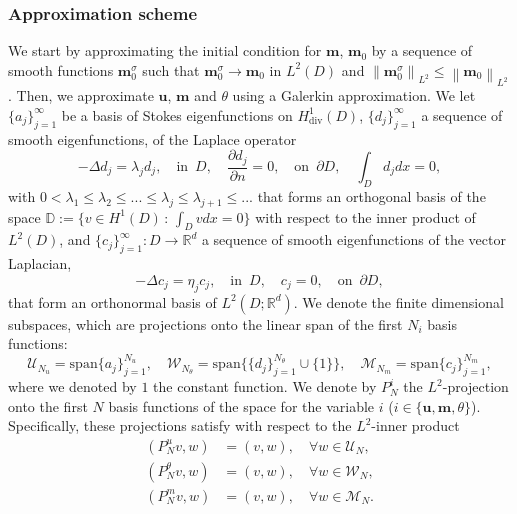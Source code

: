 \documentclass[10pt,letterpaper,twoside]{amsart}
\theoremstyle{definition}{\newtheorem{definition}[lemma]{Definition}}
\theoremstyle{note}{\newtheorem{claim}{Claim}[section]
\newtheorem*{claim*}{Claim}}
\numberwithin{equation}{section}
\newcommand{\dom}{D}
\newcommand{\norm}[1]{\left\| #1 \right\|}
\newcommand{\R}{\mathbb{R}}
\newcommand{\Div}{\operatorname{div}}
\newcommand{\V}{H^1_{\Div}(\dom)}
\newcommand{\ths}{\mathbb{D}} %
\newcommand{\bu}{\mathbf{u}}
\newcommand{\bm}{\mathbf{m}}
\begin{document}
\subsubsection{Approximation scheme}
\label{sec:scheme}
We start by approximating the initial condition for $\bm$, $\bm_0$ by a sequence of smooth functions $\bm_0^\sigma$ such that $\bm_0^\sigma\to \bm_0$ in $L^2(\dom)$ and $\norm{\bm_0^\sigma}_{L^2}\leq \norm{\bm_0}_{L^2}$.
Then, we approximate $\bu$, $\bm$ and $\theta$ using a Galerkin approximation. We let $\{a_j\}_{j=1}^\infty$ be a basis of Stokes eigenfunctions on $\V$, $\{d_j\}_{j=1}^\infty$ a sequence of smooth eigenfunctions, of the Laplace operator
\begin{equation*}
	-\Delta d_j = \lambda_j d_j,\quad \text{in }\,\dom,\quad \frac{\partial d_j}{\partial n}=0,\quad \text{on }\, \partial \dom,\quad \int_{\dom} d_j dx =0,
\end{equation*}
with $0<\lambda_1\leq \lambda_2\leq ...\leq \lambda_j\leq \lambda_{j+1}\leq ...$
that forms an orthogonal basis of the space $\ths:=\{v\in H^1(\dom)\,:\, \int_{\dom} v dx =0\}$ with respect to the inner product of $L^2(\dom)$, and $\{c_j\}_{j=1}^\infty:\dom\to \R^d$ a sequence of smooth eigenfunctions of the vector Laplacian,
\begin{equation*}
	-\Delta c_j = \eta_j c_j,\quad \text{in }\, \dom,\quad c_j=0,\quad \text{on }\, \partial\dom,
\end{equation*} 
that form an orthonormal basis of $L^2(\dom;\R^d)$.
We denote the finite dimensional subspaces, which are projections onto the linear span of the first $N_i$ basis functions:
\begin{equation*}
	\mathcal{U}_{N_u} = \text{span}\{a_j\}_{j=1}^{N_u},\quad \mathcal{W}_{N_\theta} = \text{span}\{\{d_j\}_{j=1}^{N_\theta}\cup \{1\}\},\quad  \mathcal{M}_{N_m} = \text{span}\{c_j\}_{j=1}^{N_m},
\end{equation*}
where we denoted by $1$ the constant function.
We denote by $P^i_N$ the $L^2$-projection onto the first $N$ basis functions of the space for the variable $i$ ($i\in \{\bu,\bm,\theta\}$). Specifically, these projections satisfy with respect to the $L^2$-inner product
\begin{align*}
	(P_{N}^u v,w) &= (v,w),\quad \forall w\in \mathcal{U}_N,\\
		(P_{N}^\theta v,w) &= (v,w),\quad \forall w\in \mathcal{W}_N,\\
		(P_{N}^m v,w) &= (v,w),\quad \forall w\in \mathcal{M}_N.
\end{align*}
\end{document}
